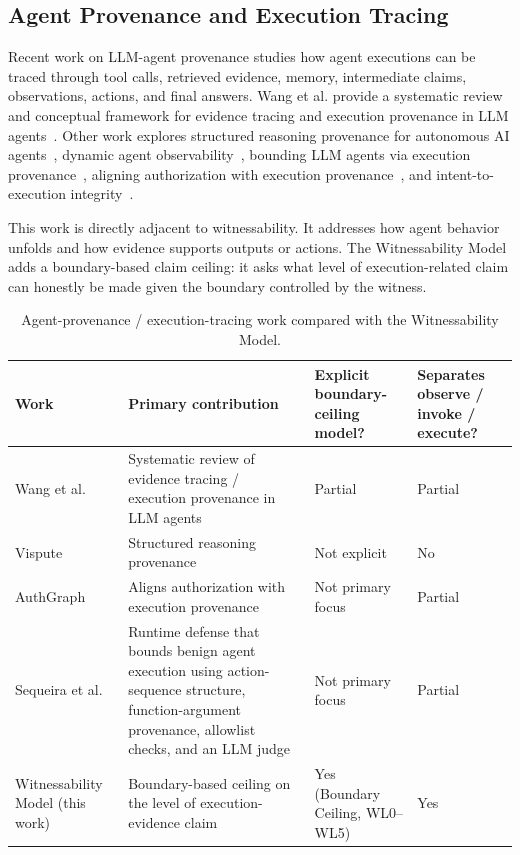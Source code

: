 \documentclass[11pt]{article}
\begin{document}
\subsection{Agent Provenance and Execution Tracing}
Recent work on LLM-agent provenance studies how agent executions can be traced through tool calls, retrieved evidence, memory, intermediate claims, observations, actions, and final answers. Wang et al. provide a systematic review and conceptual framework for evidence tracing and execution provenance in LLM agents~\cite{wang_agent_traces_2026}. Other work explores structured reasoning provenance for autonomous AI agents~\cite{vispute_reasoning_provenance_2026}, dynamic agent observability~\cite{agenttrace_2026}, bounding LLM agents via execution provenance~\cite{agent_sentry_2026}, aligning authorization with execution provenance~\cite{authgraph_2026}, and intent-to-execution integrity~\cite{intent_execution_integrity_2026}.

This work is directly adjacent to witnessability. It addresses how agent behavior unfolds and how evidence supports outputs or actions. The Witnessability Model adds a boundary-based claim ceiling: it asks what level of execution-related claim can honestly be made given the boundary controlled by the witness.

\begin{table}[h]
\centering
\small
\setlength{\tabcolsep}{4pt}
\begin{tabularx}{\textwidth}{@{}P{0.18\textwidth}Y P{0.17\textwidth}P{0.18\textwidth}@{}}
\toprule
Work & Primary contribution & Explicit boundary-ceiling model? & Separates observe / invoke / execute? \\
\midrule
Wang et al.~\cite{wang_agent_traces_2026} & Systematic review of evidence tracing / execution provenance in LLM agents & Partial & Partial \\
Vispute~\cite{vispute_reasoning_provenance_2026} & Structured reasoning provenance & Not explicit & No \\
AuthGraph~\cite{authgraph_2026} & Aligns authorization with execution provenance & Not primary focus & Partial \\
Sequeira et al.~\cite{agent_sentry_2026} & Runtime defense that bounds benign agent execution using action-sequence structure, function-argument provenance, allowlist checks, and an LLM judge & Not primary focus & Partial \\
Witnessability Model (this work) & Boundary-based ceiling on the level of execution-evidence claim & Yes (Boundary Ceiling, WL0--WL5) & Yes \\
\bottomrule
\end{tabularx}
\caption{Agent-provenance / execution-tracing work compared with the Witnessability Model.}
\end{table}
\end{document}
